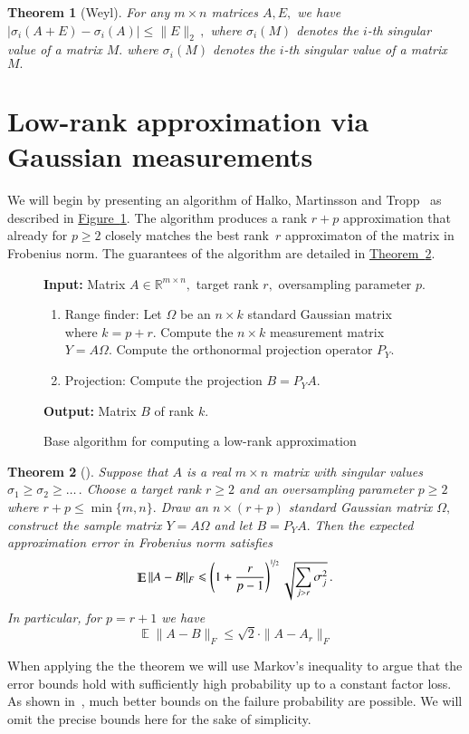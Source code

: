 \documentclass[letterpaper,11pt]{article}
\newtheorem{theorem}{Theorem}[section]
\theoremstyle{definition}
\newcommand{\figurelabel}[1]{\label{fig:#1}}
\newcommand{\figureref}[1]{\hyperref[fig:#1]{Figure~\ref{fig:#1}}}
\newcommand{\theoremref}[1]{\hyperref[thm:#1]{Theorem~\ref{thm:#1}}}
\newcommand{\Esymb}{\mathbb{E}}
\DeclareMathOperator*{\E}{\Esymb}
\newcommand{\nfrac}{\nicefrac}
\newcommand{\mper}{\,.}
\newcommand{\mcom}{\,,}
\renewcommand{\le}{\leqslant}
\renewcommand{\ge}{\geqslant}
\begin{document}
\begin{theorem}[Weyl]\label{thm:weyl}
For any $m\times n$ matrices $A,E,$ we have
$\left|\sigma_i(A+E)-\sigma_i(A)\right|\le\|E\|_2\mcom$ where $\sigma_i(M)$
denotes the $i$-th singular value of a matrix $M.$ where $\sigma_i(M)$ denotes
the $i$-th singular value of a matrix~$M.$
\end{theorem}

\section{Low-rank approximation via Gaussian measurements}

We will begin by presenting an algorithm of Halko, Martinsson and
Tropp~\cite{HalkoMT11} as described in \figureref{HMT}.  The algorithm
produces a rank $r+p$ approximation that already for $p\ge 2$ closely matches
the best rank~$r$ approximaton of the matrix in Frobenius norm. The guarantees
of the algorithm are detailed in \theoremref{HMT}.

\begin{figure}[h]
\begin{boxedminipage}{\textwidth}
{\bf Input:} Matrix $A\in\mathbb{R}^{m\times n},$ target rank $r,$ oversampling
parameter $p.$
\begin{enumerate}
\item {\sc Range finder:}
Let $\Omega$ be an $n\times k$ standard Gaussian matrix where $k=p+r.$
Compute the $n\times k$ measurement matrix $Y=A\Omega.$ Compute the
orthonormal projection operator $P_Y.$
\item {\sc Projection:} Compute the projection $B=P_YA.$
\end{enumerate}
{\bf Output:} Matrix $B$ of rank $k.$
\end{boxedminipage}
\caption{Base algorithm for computing a low-rank approximation}
\figurelabel{HMT}
\end{figure}

\begin{theorem}[\cite{HalkoMT11}]
\label{thm:HMT}
Suppose that $A$ is a real $m\times n$ matrix with singular values
$\sigma_1\ge\sigma_2\ge\dots\mper$ Choose a target rank $r\ge 2$ and an
oversampling parameter $p\ge 2$ where $r+p\le\min\{m,n\}.$ Draw an
$n\times(r+p)$ standard Gaussian matrix $\Omega,$ construct the sample
matrix $Y=A\Omega$ and let $B=P_YA.$
Then the expected approximation error in Frobenius norm satisfies
\begin{equation}\label{eq:frob-error}
\E\| A - B \|_F
\le \left(1+\frac r{p-1}\right)^{\nfrac12}\sqrt{\sum_{j>r}\sigma_j^2}\mper
\end{equation}
In particular, for $p=r+1$ we have
\begin{equation}\label{eq:simplified}
\E\| A - B \|_F \le \sqrt{2}\cdot\|A-A_r\|_F
\end{equation}
\end{theorem}
When applying the the theorem we will use Markov's inequality to argue that
the error bounds hold with sufficiently high probability up to a constant
factor loss. As shown in~\cite{HalkoMT11}, much better bounds on the failure
probability are possible. We will omit the precise bounds here for the sake of
simplicity.
\end{document}
